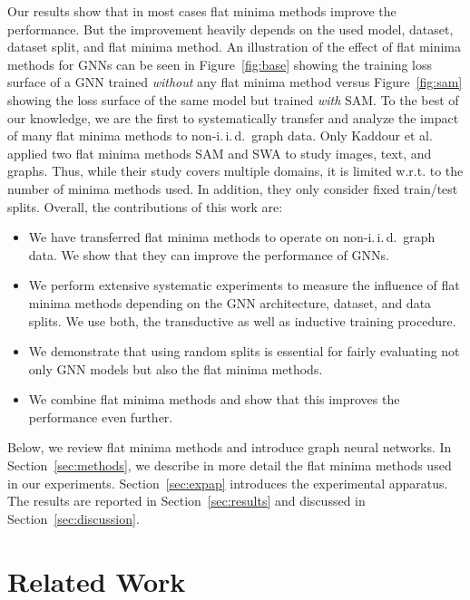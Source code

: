 \documentclass[runningheads]{llncs}
\newcommand{\iid}{i.\,i.\,d.}
\begin{document}
Our results show that in most cases flat minima methods improve the performance.
But the improvement heavily depends on the used model, dataset, dataset split, and flat minima method.
An illustration of the effect of flat minima methods for GNNs can be seen in Figure~\ref{fig:base} showing the training loss surface of a GNN trained \textit{without} any flat minima method versus Figure~\ref{fig:sam} showing the loss surface of the same model but trained \textit{with} SAM.
To the best of our knowledge, we are the first to systematically transfer and analyze the impact of many flat minima methods to non-\iid\ graph data.
Only Kaddour et al.~\cite{Shchur18pitfalls} applied two flat minima methods SAM and SWA to study images, text, and graphs.
Thus, while their study covers multiple domains, it is limited w.r.t. to the number of minima methods used.
In addition, they only consider fixed train/test splits.
Overall, the contributions of this work are:
\begin{itemize}
    \item 
    We have transferred flat minima methods to operate on non-\iid\ graph data.
    We show that they can improve the performance of GNNs.
    
    \item We perform extensive systematic experiments to measure the influence of flat minima methods depending on the GNN architecture, dataset, and data splits.
    We use both, the transductive as well as inductive training procedure.

   \item We demonstrate that using random splits is essential for fairly evaluating not only GNN models but also the flat minima methods.
   
  \item We combine flat minima methods and show that this improves the performance even further.

\end{itemize}


Below, we review flat minima methods and introduce graph neural networks.
In Section~\ref{sec:methods}, we describe in more detail the flat minima methods used in our experiments.
Section~\ref{sec:expap} introduces the experimental apparatus.
The results are reported in Section~\ref{sec:results} and discussed in Section~\ref{sec:discussion}.

\section{Related Work}
\label{sec:RW}
\end{document}
